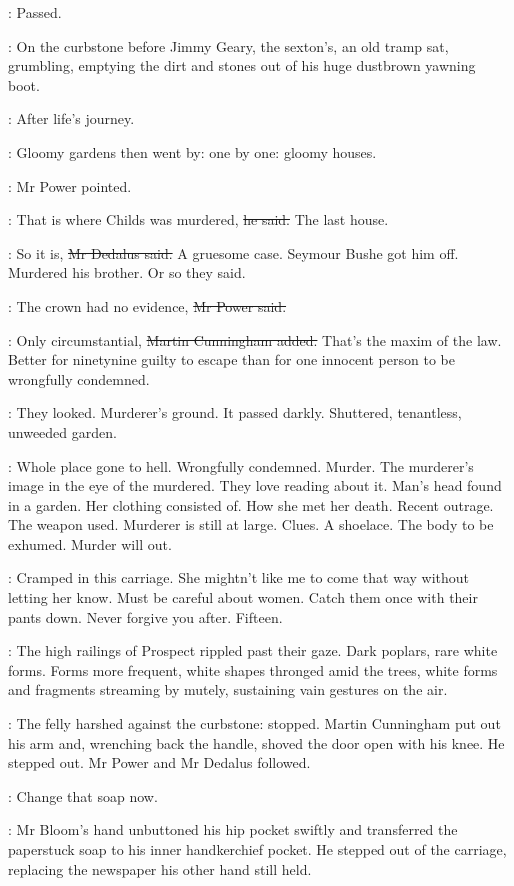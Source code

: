\BloomInt:
Passed.

:
On the curbstone before Jimmy Geary, the sexton's,
an old tramp sat, grumbling,
emptying the dirt and stones out of his huge dustbrown yawning boot.

\BloomInt:
After life's journey.

:
Gloomy gardens then went by:
one by one:
gloomy houses.

:
Mr Power pointed.

\power:
That is where Childs was murdered,
\sout{he said.}
The last house.

\simon:
So it is,
\sout{Mr Dedalus said.}
A gruesome case.
Seymour Bushe got him off.
Murdered his brother.
Or so they said.

\power:
The crown had no evidence,
\sout{Mr Power said.}

\cunningham:
Only circumstantial,
\sout{Martin Cunningham added.}
That's the maxim of the law.
Better for ninetynine guilty to escape
than for one innocent person to be wrongfully condemned.

:
They looked.
Murderer's ground.
It passed darkly.
Shuttered, tenantless, unweeded garden.

\BloomInt:
Whole place gone to hell.
Wrongfully condemned.
Murder.
The murderer's image in the eye of the murdered.
They love reading about it.
Man's head found in a garden.
Her clothing consisted of.
How she met her death.
Recent outrage.
The weapon used.
Murderer is still at large.
Clues.
A shoelace.
The body to be exhumed.
Murder will out.

\BloomInt:
Cramped in this carriage.
She mightn't like me to come that way without letting her know.
Must be careful about women.
Catch them once with their pants down.
Never forgive you after.
Fifteen.

:
The high railings of Prospect rippled past their gaze.
Dark poplars, rare white forms.
Forms more frequent,
white shapes thronged amid the trees,
white forms and fragments streaming by mutely,
sustaining vain gestures on the air.

:
The felly harshed against the curbstone:
stopped.
Martin Cunningham put out his arm
and, wrenching back the handle,
shoved the door open with his knee.
He stepped out.
Mr Power and Mr Dedalus followed.

\BloomInt:
Change that soap now.

:
Mr Bloom's hand unbuttoned his hip pocket swiftly
and transferred the paperstuck soap to his inner handkerchief pocket.
He stepped out of the carriage,
replacing the newspaper his other hand still held.
